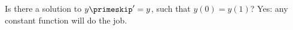 {Is there a solution to $y\primeskip' = y$, such that $y(0) = y(1)$?}
{Yes: any constant function will do the job.}